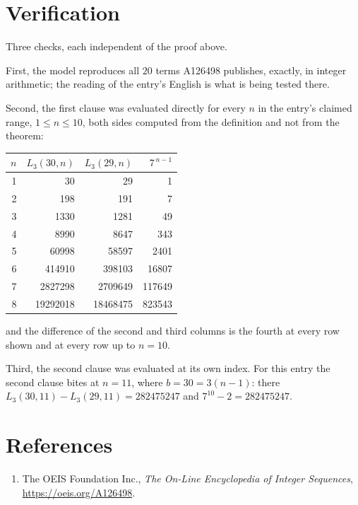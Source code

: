 \documentclass[11pt,a4paper]{article}
\theoremstyle{plain}
\theoremstyle{definition}
\begin{document}
\section{Verification}

Three checks, each independent of the proof above.

First, the model reproduces all $20$ terms A126498 publishes, exactly, in integer
arithmetic; the reading of the entry's English is what is being tested there.

Second, the first clause was evaluated directly for every $n$ in the entry's claimed range,
$1\le n\le10$, both sides computed from the definition and not from the theorem:

\begin{center}
\begin{tabular}{rrrr}
$n$ & $L_{3}(30,n)$ & $L_{3}(29,n)$ & $7^{\,n-1}$ \\ \hline
1 & 30 & 29 & 1 \\
2 & 198 & 191 & 7 \\
3 & 1330 & 1281 & 49 \\
4 & 8990 & 8647 & 343 \\
5 & 60998 & 58597 & 2401 \\
6 & 414910 & 398103 & 16807 \\
7 & 2827298 & 2709649 & 117649 \\
8 & 19292018 & 18468475 & 823543 \\
\end{tabular}
\end{center}

\noindent and the difference of the second and third columns is the fourth at every row shown
and at every row up to $n=10$.

Third, the second clause was evaluated at its own index. For this entry the second clause bites at $n=11$, where $b=30=3(n-1)$: there $L_{3}(30,11)-L_{3}(29,11)=282475247$ and $7^{10}-2=282475247$.

\section*{References}
\begin{enumerate}
\item The OEIS Foundation Inc., \emph{The On-Line Encyclopedia of Integer Sequences},
\url{https://oeis.org/A126498}.
\end{enumerate}
\end{document}
